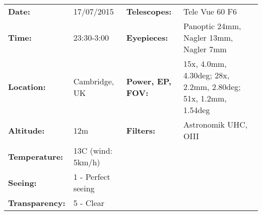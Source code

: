 \begin{tabular}{ p{0.9in} p{1.3in} p{1.2in} p{5.2in}}
{\bf Date:} & 17/07/2015 & {\bf Telescopes:} & Tele Vue 60 F6 \\ 
{\bf Time:} & 23:30-3:00 & {\bf Eyepieces:} & Panoptic 24mm, Nagler 13mm, Nagler 7mm \\ 
{\bf Location:} & Cambridge, UK & {\bf Power, EP, FOV:} & 15x, 4.0mm, 4.30deg; 28x, 2.2mm, 2.80deg; 51x, 1.2mm, 1.54deg \\ 
{\bf Altitude:} & 12m & {\bf Filters:} & Astronomik UHC, OIII \\ 
{\bf Temperature:} & 13C (wind: 5km/h) & & \\ 
{\bf Seeing:} & 1 - Perfect seeing & & \\ 
{\bf Transparency:} & 5 - Clear & & \\ 
\end{tabular}
